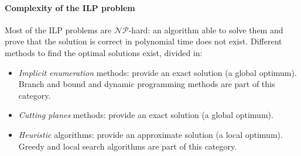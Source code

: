 \paragraph{Complexity of the ILP problem}
Most of the ILP problems are $\mathcal{NP}$-hard:
an algorithm able to solve them and prove that the solution is correct in polynomial time does not exist.
Different methods to find the optimal solutions exist, divided in:
\begin{itemize}
    \item \textit{Implicit enumeration} methods: provide an exact solution (a global optimum). 
        Branch and bound and dynamic programming methods are part of this category. 
    \item \textit{Cutting planes} methods: provide an exact solution (a global optimum). 
    \item \textit{Heuristic} algorithms: provide an approximate solution (a local optimum). 
        Greedy and local search algorithms are part of this category. 
\end{itemize}